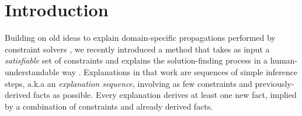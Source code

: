 \documentclass[a4paper,UKenglish,cleveref, autoref, thm-restate, pdfa]{lipics-v2021}
\renewcommand\comment[1]{}
\newcommand{\emilio}[1]{{\comment{\color{red}Emilio: #1}}}
\newcommand{\bart}[1]{{\comment{\color{OliveGreen}Bart: #1}}}
\begin{document}
\section{Introduction}
\label{sec:introduction}
%





Building on old ideas to explain domain-specific propagations performed by constraint solvers \cite{sqalli1996inference,freuder2001explanation}, we recently introduced a method that takes as input a \emph{satisfiable} set of constraints
and explains the solution-finding process in a human-understandable way \cite{ecai/BogaertsGCG20}. 
Explanations in that work are sequences of simple inference steps, a.k.a an \emph{explanation sequence}, involving as few constraints and previously-derived facts as possible. Every explanation derives at least one new fact, implied by a combination of constraints and already derived facts.
\end{document}
